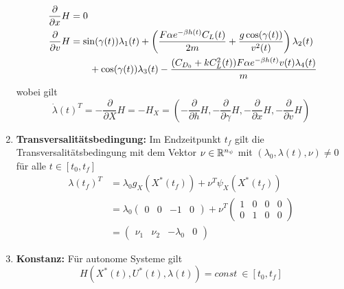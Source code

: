 \begin{enumerate}
\begin{equation}
\begin{split}
\dfrac{\partial}{\partial x} H &= 0 \\\
\dfrac{\partial}{\partial v} H &= \sin(\gamma(t)) \lambda_1(t) + \left( \dfrac{F \alpha e^{-\beta h(t)} C_L(t)}{2m} + \dfrac{g \cos(\gamma(t))}{v^2(t)} \right) \lambda_2(t) \\\
&\hspace{7mm} + \cos(\gamma(t)) \lambda_3(t) - \dfrac{(C_{D_0} + k C_L^2(t)) F \alpha e^{-\beta h(t)} v(t) \lambda_4(t)}{m}
\end{split}
\end{equation}
        wobei gilt 
        \[\dot{\lambda}(t)^T = - \dfrac{\partial}{\partial X} H = -H_{X} = \left( -\dfrac{\partial}{\partial h} H, -\dfrac{\partial}{\partial \gamma} H, -\dfrac{\partial}{\partial x} H, -\dfrac{\partial}{\partial v} H \right)\]
    \item \textbf{Transversalitätsbedingung:} Im Endzeitpunkt $t_f$ gilt die Transversalitätsbedingung mit dem Vektor $\nu \in \mathbb{R}^{n_{\psi}}$ mit $(\lambda_0,\lambda(t),\nu) \neq 0$ für alle $t \in [t_0,t_f]$
        \[\begin{split}
            \lambda(t_f)^T &= \lambda_0 g_X(X^{\ast}(t_f)) + \nu^T \psi_X(X^{\ast}(t_f)) \\\
            &= \lambda_0 
            \begin{pmatrix}
            0 & 0 & -1 & 0
            \end{pmatrix}  
            + \nu^T 
            \begin{pmatrix}
            1 & 0 & 0 & 0 \\
            0 & 1 & 0 & 0 
            \end{pmatrix}  \\\
            &= \begin{pmatrix}
            \nu_1 & \nu_2 & -\lambda_0 & 0 
            \end{pmatrix}
        \end{split}\]
    \item \textbf{Konstanz:} Für autonome Systeme gilt 
\begin{equation}\label{func:HKonstanz}
H(X^{\ast}(t),U^{\ast}(t), \lambda(t)) = const \ \in [t_0,t_f]
\end{equation}
\end{enumerate}














